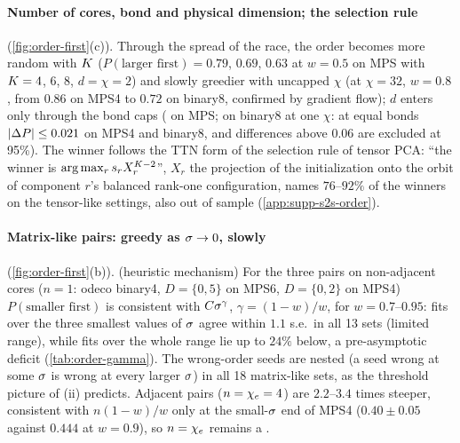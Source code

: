 \paragraph{Number of cores, bond and physical dimension; the selection rule} (\cref{fig:order-first}(c)).
\empirical{} Through the spread of the race, the order becomes more random with $K$ ($P(\text{larger first})=0.79$,
$0.69$, $0.63$ at $w=0.5$ on MPS with $K=4$, $6$, $8$, $d=\chi=2$) and slowly greedier with uncapped $\chi$ (at
$\chi=32$, $w=0.8$, from $0.86$ on MPS4 to $0.72$ on binary8, confirmed by gradient flow); $d$ enters only through the
bond caps (\derived{} on MPS; \empirical{} on binary8 at one $\chi$: at equal bonds $\lvert\Delta P\rvert\le0.021$ on MPS4
and binary8, and differences above $0.06$ are excluded at 95\%). The winner follows the TTN form of the selection rule
of tensor PCA: ``the winner is $\arg\max_rs_{r}X_r^{K-2}$'', $X_r$ the projection of the initialization onto the
orbit of component $r$'s balanced rank-one configuration, names $76$--$92\%$ of the winners on the tensor-like
settings, also out of sample (\cref{app:supp-s2s-order}). \newresult
{}

\paragraph{Matrix-like pairs: greedy as $\sigma\to0$, slowly} (\cref{fig:order-first}(b)).
\empirical{} (heuristic mechanism) For the three pairs on non-adjacent cores ($n=1$: odeco binary4, $D=\{0,5\}$ on
MPS6, $D=\{0,2\}$ on MPS4) $P(\text{smaller first})$ is consistent with $C\sigma^{\gamma}$, $\gamma=(1-w)/w$, for
$w=0.7$--$0.95$: fits over the three smallest values of $\sigma$ agree within $1.1$ s.e.\ in all 13 sets (limited
range), while fits over the whole range lie up to $24\%$ below, a pre-asymptotic deficit (\cref{tab:order-gamma}).
The wrong-order seeds are nested (a seed wrong at some $\sigma$ is wrong at every larger $\sigma$) in all 18 matrix-like
sets, as the threshold picture of (ii) predicts. Adjacent pairs ($n=\chi_{e}=4$) are $2.2$--$3.4$ times steeper,
consistent with $n(1-w)/w$ only at the small-$\sigma$ end of MPS4 ($0.40\pm0.05$ against $0.444$ at $w=0.9$), so
$n=\chi_{e}$ remains a \conjecture. 

